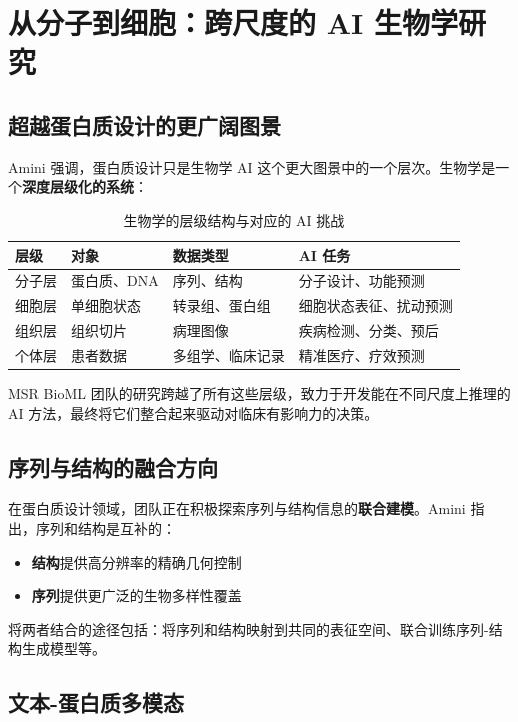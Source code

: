 \section{从分子到细胞：跨尺度的 AI 生物学研究}

\subsection{超越蛋白质设计的更广阔图景}

Amini 强调，蛋白质设计只是生物学 AI 这个更大图景中的一个层次。生物学是一个\textbf{深度层级化的系统}：

\begin{table}[H]
\centering
\caption{生物学的层级结构与对应的 AI 挑战}
\begin{tabular}{@{}llll@{}}
\toprule
\textbf{层级} & \textbf{对象} & \textbf{数据类型} & \textbf{AI 任务} \\
\midrule
分子层 & 蛋白质、DNA & 序列、结构 & 分子设计、功能预测 \\
细胞层 & 单细胞状态 & 转录组、蛋白组 & 细胞状态表征、扰动预测 \\
组织层 & 组织切片 & 病理图像 & 疾病检测、分类、预后 \\
个体层 & 患者数据 & 多组学、临床记录 & 精准医疗、疗效预测 \\
\bottomrule
\end{tabular}
\end{table}

MSR BioML 团队的研究跨越了所有这些层级，致力于开发能在不同尺度上推理的 AI 方法，最终将它们整合起来驱动对临床有影响力的决策。

\subsection{序列与结构的融合方向}

在蛋白质设计领域，团队正在积极探索序列与结构信息的\textbf{联合建模}。Amini 指出，序列和结构是互补的：

\begin{itemize}
    \item \textbf{结构}提供高分辨率的精确几何控制
    \item \textbf{序列}提供更广泛的生物多样性覆盖
\end{itemize}

将两者结合的途径包括：将序列和结构映射到共同的表征空间、联合训练序列-结构生成模型等。

\subsection{文本-蛋白质多模态}

